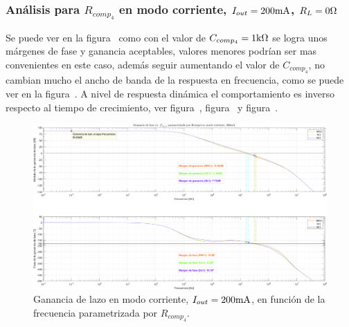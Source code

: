 \subsubsection{Análisis para $R_{comp_{4}}$ en modo corriente, $I_{out} = 200 \si[per-mode=symbol]{\milli\ampere}$, $R_{L} = 0 \si[per-mode=symbol]{\ohm}$}

Se puede ver en la figura~ como con el valor de $C_{comp_{4}} = 1 \si[per-mode=symbol]{\kilo\ohm}$ se logra unos márgenes de fase y ganancia aceptables, valores menores podrían ser mas convenientes en este caso, además seguir aumentando el valor de $C_{comp_{4}}$, no cambian mucho el ancho de banda de la respuesta en frecuencia, como se puede ver en la figura~. A nivel de respuesta dinámica el comportamiento es inverso respecto al tiempo de crecimiento, ver figura~, figura~ y figura~.

\vfill



\clearpage

\begin{figure}[H] %
\begin{center}
\includegraphics[width=1.1 \textwidth, angle=90]{./img/plots/loop/power_supply_RCOMP4_LOOP_Modo4.png}
\caption{\label{fig:fig_power_supply_RCOMP4_LOOP_Modo4}\footnotesize{Ganancia de lazo en modo corriente, $I_{out} = 200 \si[per-mode=symbol]{\milli\ampere}$, en función de la frecuencia parametrizada por $R_{comp_{4}}$.}}
\end{center}
\end{figure}


